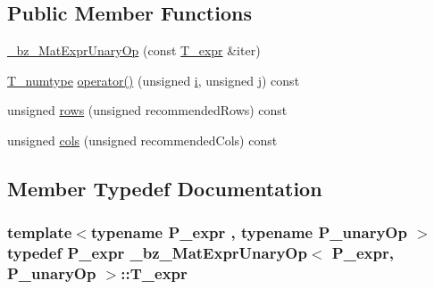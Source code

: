 \subsection*{Public Member Functions}
\begin{DoxyCompactItemize}
\item 
\hyperlink{class__bz__MatExprUnaryOp_a559b2ce7c6e072db3cb9050978de3f28}{\+\_\+bz\+\_\+\+Mat\+Expr\+Unary\+Op} (const \hyperlink{class__bz__MatExprUnaryOp_a65c601c6f2db6a86a98c6e97f3622276}{T\+\_\+expr} \&iter)
\item 
\hyperlink{class__bz__MatExprUnaryOp_aa1693d8e8ebc8e222d658d83b15e943c}{T\+\_\+numtype} \hyperlink{class__bz__MatExprUnaryOp_a93da329b6a4e196eb47d2e30e6a1e14c}{operator()} (unsigned \hyperlink{indexexpr_8h_aabd77643995707c185e95c8cb2782c81}{i}, unsigned \hyperlink{indexexpr_8h_aa1f3325d66516548e69238097857fa98}{j}) const 
\item 
unsigned \hyperlink{class__bz__MatExprUnaryOp_a1d8c3f4f5a798b473a7b192cea7551ac}{rows} (unsigned recommended\+Rows) const 
\item 
unsigned \hyperlink{class__bz__MatExprUnaryOp_a2a772f5c86bd51198b4eeefcf5912a36}{cols} (unsigned recommended\+Cols) const 
\end{DoxyCompactItemize}


\subsection{Member Typedef Documentation}
\hypertarget{class__bz__MatExprUnaryOp_a65c601c6f2db6a86a98c6e97f3622276}{}
\subsubsection[{T\+\_\+expr}]{\setlength{\rightskip}{0pt plus 5cm}template$<$typename P\+\_\+expr , typename P\+\_\+unary\+Op $>$ typedef P\+\_\+expr {\bf \+\_\+bz\+\_\+\+Mat\+Expr\+Unary\+Op}$<$ P\+\_\+expr, P\+\_\+unary\+Op $>$\+::{\bf T\+\_\+expr}}\label{class__bz__MatExprUnaryOp_a65c601c6f2db6a86a98c6e97f3622276}
\hypertarget{class__bz__MatExprUnaryOp_aa1693d8e8ebc8e222d658d83b15e943c}{}
